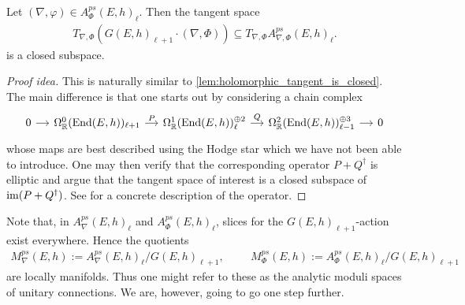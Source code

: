 \documentclass[12pt]{ociamthesis}  %
\begin{document}
\begin{lemma}
  Let $(\nabla,\varphi)\in A_\Phi^{ps}(E,h)_\ell$. Then the tangent space
  \begin{align*}
    T_{\nabla,\Phi}(G(E,h)_{\ell+1}\cdot(\nabla,\Phi))
    \subseteq T_{\nabla,\Phi}A_{\nabla,\Phi}^{ps}(E,h)_\ell.
  \end{align*}
  is a closed subspace.
  \begin{proof}[Proof idea]
    This is naturally similar to \ref{lem:holomorphic_tangent_is_closed}.
    The main difference is that one starts out by considering a chain
    complex
    \begin{equation*}
      \begin{tikzcd}[column sep=small]
        0 & {\Omega^0_{\mathbb R}(\End(E,h))_{\ell+1}} & {\Omega^1_{\mathbb R}(\End(E,h))^{\oplus 2}_\ell} & {\Omega^2_{\mathbb R}(\End(E,h))^{\oplus 3}_{\ell-1}} & 0
        \arrow[from=1-1, to=1-2]
        \arrow["P", from=1-2, to=1-3]
        \arrow["Q", from=1-3, to=1-4]
        \arrow[from=1-4, to=1-5]
      \end{tikzcd}
    \end{equation*}
    whose maps are best described using the Hodge star which we have
    not been able to introduce. One may then
    verify that the corresponding operator $P+Q^\dagger$ is elliptic
    and argue that the tangent space of interest is a closed subspace
    of $\operatorname{im}(P+Q^\dagger)$. See \cite[98]{neitzke2021} for a concrete
    description of the operator.
  \end{proof}
\end{lemma}

Note that, in $A^{ps}_\nabla(E,h)_\ell$ and $A^{ps}_\Phi(E,h)_\ell$, slices for the
$G(E,h)_{\ell+1}$-action exist everywhere. Hence the quotients
\begin{align*}
  M^{ps}_\nabla(E,h) := A^{ps}_\nabla(E,h)_\ell / G(E,h)_{\ell+1},\hspace{1cm}
  M^{ps}_\Phi(E,h) := A^{ps}_\Phi(E,h)_\ell / G(E,h)_{\ell+1}
\end{align*}
are locally manifolds. Thus one might refer to these as the analytic
moduli spaces of unitary connections. We are, however, going to go
one step further.
\end{document}
